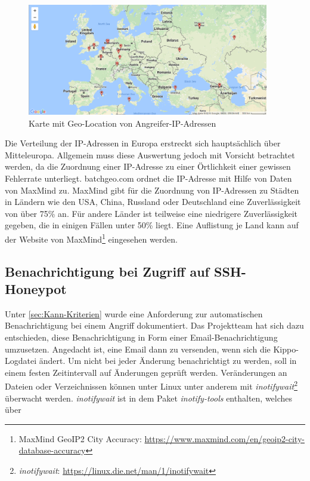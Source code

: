 \begin{figure}[ht]
	\centering
		\includegraphics[width=0.94\textwidth]{img/geo_ip_eu.png}
	\caption{Karte mit Geo-Location von Angreifer-IP-Adressen}
	\label{fig:geo_ip_eu}
\end{figure}

Die Verteilung der IP-Adressen in Europa erstreckt sich hauptsächlich über Mitteleuropa. Allgemein muss diese Auswertung jedoch mit Vorsicht betrachtet werden, da die Zuordnung einer IP-Adresse zu einer Örtlichkeit einer gewissen Fehlerrate unterliegt. batchgeo.com ordnet die IP-Adresse mit Hilfe von Daten von MaxMind zu. MaxMind gibt für die Zuordnung von IP-Adressen zu Städten in Ländern wie den USA, China, Russland oder Deutschland eine Zuverlässigkeit von über 75\% an. Für andere Länder ist teilweise eine niedrigere Zuverlässigkeit gegeben, die in einigen Fällen unter 50\% liegt. Eine Auflistung je Land kann auf der Website von MaxMind\footnote{ MaxMind GeoIP2 City Accuracy: \url{https://www.maxmind.com/en/geoip2-city-database-accuracy}} eingesehen werden.



\subsection{Benachrichtigung bei Zugriff auf SSH-Honeypot}
\label{subsec:Benachrichtigung bei Zugriff auf SSH-Honeypot}

Unter \ref{sec:Kann-Kriterien} wurde eine Anforderung zur automatischen Benachrichtigung bei einem Angriff dokumentiert. Das Projektteam hat sich dazu entschieden, diese Benachrichtigung in Form einer Email-Benachrichtigung umzusetzen. Angedacht ist, eine Email dann zu versenden, wenn sich die Kippo-Logdatei ändert. Um nicht bei jeder Änderung benachrichtigt zu werden, soll in einem festen Zeitintervall auf Änderungen geprüft werden. Veränderungen an Dateien oder Verzeichnissen können unter Linux unter anderem mit \textit{inotifywait}\footnote{ \textit{inotifywait}: \url{https://linux.die.net/man/1/inotifywait}} überwacht werden. \textit{inotifywait} ist in dem Paket \textit{inotify-tools} enthalten, welches über

